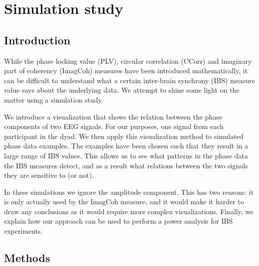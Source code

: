 
\section{Simulation study}

\subsection{Introduction}

While the phase locking value (PLV), circular correlation (CCorr) and
imaginary part of coherency (ImagCoh) measures have been introduced
mathematically, it can be difficult to understand what a certain inter-brain
synchrony (IBS) measure value says about the underlying data. We attempt to
shine some light on the matter using a simulation study.

We introduce a visualization that shows the relation between the phase
components of two EEG signals. For our purposes, one signal from each
participant in the dyad. We then apply this visualization method to simulated
phase data examples. The examples have been chosen such that they result in a
large range of IBS values. This allows us to see what patterns in the
phase data the IBS measures detect, and as a result what relations between the two
signals they are sensitive to (or not).

In these simulations we ignore the amplitude component. This has two reasons: it
is only actually used by the ImagCoh measure, and it would make it harder to
draw any conclusions as it would require more complex visualizations. Finally,
we explain how our approach can be used to perform a power analysis for IBS
experiments.

\subsection{Methods}

